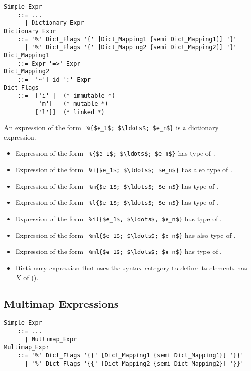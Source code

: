 \grammar\begin{lstlisting}
Simple_Expr 
    ::= ...
      | Dictionary_Expr
Dictionary_Expr 
    ::= '%' Dict_Flags '{' [Dict_Mapping1 {semi Dict_Mapping1}] '}'
      | '%' Dict_Flags '{' [Dict_Mapping2 {semi Dict_Mapping2}] '}'
Dict_Mapping1
    ::= Expr '=>' Expr
Dict_Mapping2 
    ::= ['~'] id ':' Expr
Dict_Flags
    ::= [['i' |  (* immutable *)
          'm']   (* mutable *)
         ['l']]  (* linked *)
\end{lstlisting}

An expression of the form ~\lstinline!%{$e_1$; $\ldots$; $e_n$}! is a dictionary expression. 

\begin{itemize}
  \item Expression of the form ~\lstinline!%{$e_1$; $\ldots$; $e_n$}!
    has type of . 
  \item Expression of the form ~\lstinline!%i{$e_1$; $\ldots$; $e_n$}!
    has also type of . 
  \item Expression of the form ~\lstinline!%m{$e_1$; $\ldots$; $e_n$}!
    has type of .
  \item Expression of the form ~\lstinline!%l{$e_1$; $\ldots$; $e_n$}!
    has type of . 
  \item Expression of the form ~\lstinline!%il{$e_1$; $\ldots$; $e_n$}!
    has type of . 
  \item Expression of the form ~\lstinline!%ml{$e_1$; $\ldots$; $e_n$}!
    has also type of .
  \item Expression of the form ~\lstinline!%ml{$e_1$; $\ldots$; $e_n$}!
    has type of .
  \item Dictionary expression that uses the  syntax category to define its elements has $K$ of  (). 
\end{itemize}





\subsection{Multimap Expressions}
\label{sec:multimap-expressions}

\grammar\begin{lstlisting}
Simple_Expr 
    ::= ...
      | Multimap_Expr
Multimap_Expr 
    ::= '%' Dict_Flags '{{' [Dict_Mapping1 {semi Dict_Mapping1}] '}}'
      | '%' Dict_Flags '{{' [Dict_Mapping2 {semi Dict_Mapping2}] '}}'
\end{lstlisting}

